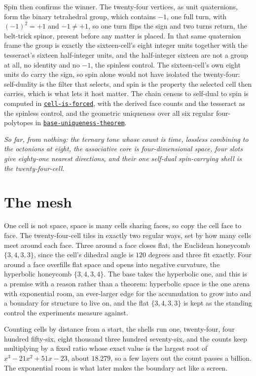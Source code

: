 \documentclass{article}
\newcommand{\code}[2]{\href{https://github.com/cluesurf/vibe/blob/make/#1}{\texttt{#2}}}
\begin{document}
Spin then confirms the winner. The twenty-four vertices, as unit quaternions, form the binary
tetrahedral group, which contains $-1$, one full turn, with $(-1)^2 = +1$ and $-1 \neq +1$, so one
turn flips the sign and two turns return, the belt-trick spinor, present before any matter is
placed. In that same quaternion frame the group is exactly the sixteen-cell's eight integer units
together with the tesseract's sixteen half-integer units, and the half-integer sixteen are not a
group at all, no identity and no $-1$, the spinless control. The sixteen-cell's own eight units do
carry the sign, so spin alone would not have isolated the twenty-four: self-duality is the filter
that selects, and spin is the property the selected cell then carries, which is what lets it host
matter. The chain census to self-dual to spin is computed in
\code{test/experiment/foundations/cell-is-forced.ts}{cell-is-forced}, with the derived face counts
and the tesseract as the spinless control, and the geometric uniqueness over all six regular
four-polytopes in
\code{test/experiment/foundations/base-uniqueness-theorem.ts}{base-uniqueness-theorem}.

\emph{So far, from nothing: the ternary tone whose count is time, lossless combining to the
octonions at eight, the associative core is four-dimensional space, four slots give eighty-one
nearest directions, and their one self-dual spin-carrying shell is the twenty-four-cell.}

\section{The mesh}

One cell is not space, space is many cells sharing faces, so copy the cell face to face. The
twenty-four-cell tiles in exactly two regular ways, set by how many cells meet around each face.
Three around a face closes flat, the Euclidean honeycomb $\{3,4,3,3\}$, since the cell's dihedral
angle is $120$ degrees and three fit exactly. Four around a face overfills flat space and opens
into negative curvature, the hyperbolic honeycomb $\{3,4,3,4\}$. The base takes the hyperbolic
one, and this is a premise with a reason rather than a theorem: hyperbolic space is the one arena
with exponential room, an ever-larger edge for the accumulation to grow into and a boundary for
structure to live on, and the flat $\{3,4,3,3\}$ is kept as the standing control the experiments
measure against.

Counting cells by distance from a start, the shells run one, twenty-four, four hundred
fifty-six, eight thousand three hundred seventy-six, and the counts keep multiplying by a fixed
ratio whose exact value is the largest root of $x^3 - 21x^2 + 51x - 23$, about $18.279$, so a few
layers out the count passes a billion. The
exponential room is what later makes the boundary act like a screen.
\end{document}
